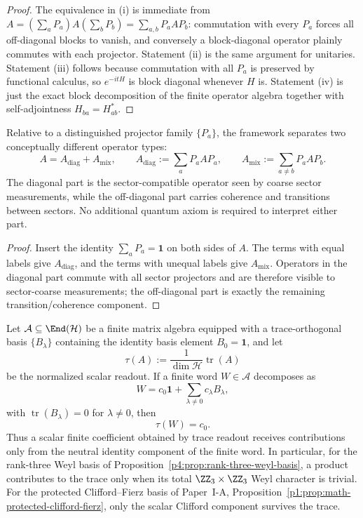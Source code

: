 \documentclass[12pt,a4paper]{article}
\begin{document}
\begin{proof}
The equivalence in (i) is immediate from
$A=(\sum_a P_a)A(\sum_b P_b)=\sum_{a,b}P_aAP_b$:
commutation with every $P_a$ forces all off-diagonal blocks to vanish, and conversely a block-diagonal operator plainly commutes with each projector.
Statement (ii) is the same argument for unitaries.
Statement (iii) follows because commutation with all $P_a$ is preserved by functional calculus, so $e^{-itH}$ is block diagonal whenever $H$ is.
Statement (iv) is just the exact block decomposition of the finite operator algebra together with self-adjointness $H_{ba}=H_{ab}^*$.
\end{proof}

\begin{corollary}
\label{p4:cor:sector-vs-mixing-observables}
Relative to a distinguished projector family $\{P_a\}$, the framework separates two conceptually different operator types:
\begin{equation}
\label{p4:eq:sector-vs-mixing-split}
A=A_{\mathrm{diag}}+A_{\mathrm{mix}},
\qquad
A_{\mathrm{diag}}:=\sum_a P_aAP_a,
\qquad
A_{\mathrm{mix}}:=\sum_{a\neq b} P_aAP_b.
\end{equation}
The diagonal part is the sector-compatible operator seen by coarse sector measurements,
while the off-diagonal part carries coherence and transitions between sectors.
No additional quantum axiom is required to interpret either part.
\end{corollary}

\begin{proof}
Insert the identity \(\sum_aP_a=\mathbf1\) on both sides of \(A\).  The terms with equal labels give \(A_{\mathrm{diag}}\), and the terms with unequal labels give \(A_{\mathrm{mix}}\).  Operators in the diagonal part commute with all sector projectors and are therefore visible to sector-coarse measurements; the off-diagonal part is exactly the remaining transition/coherence component.
\end{proof}


\begin{proposition}
\label{p4:prop:trace-neutral-finite-word-selection}
Let \(\mathcal A\subseteq\End(\mathcal H)\) be a finite matrix algebra equipped with a trace-orthogonal basis \(\{B_\lambda\}\) containing the identity basis element \(B_0=\mathbf 1\), and let
\[
\tau(A):=\frac{1}{\dim\mathcal H}\operatorname{tr}(A)
\]
be the normalized scalar readout.
If a finite word \(W\in\mathcal A\) decomposes as
\[
W=c_0\mathbf 1+\sum_{\lambda\ne0}c_\lambda B_\lambda,
\]
with \(\operatorname{tr}(B_\lambda)=0\) for \(\lambda\ne0\), then
\[
\tau(W)=c_0.
\]
Thus a scalar finite coefficient obtained by trace readout receives contributions only from the neutral identity component of the finite word.
In particular, for the rank-three Weyl basis of Proposition~\ref{p4:prop:rank-three-weyl-basis}, a product contributes to the trace only when its total \(\ZZ_3\times\ZZ_3\) Weyl character is trivial.
For the protected Clifford--Fierz basis of Paper~I-A, Proposition~\ref{p1:prop:math-protected-clifford-fierz}, only the scalar Clifford component survives the trace.
\end{proposition}
\end{document}
